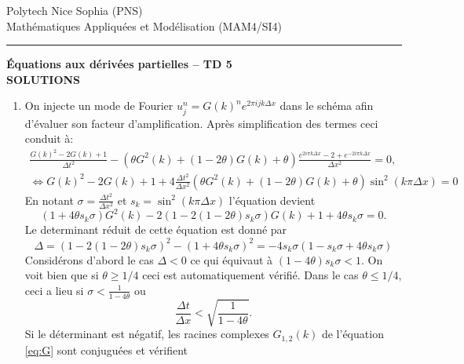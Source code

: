 \documentclass[12pt,a4paper]{article}
\begin{document}
 \hfill Polytech Nice Sophia (PNS)\\
\noindent Math\'ematiques Appliqu\'ees et Mod\'elisation (MAM4/SI4) \hfill \\

\hrule

\bigskip
\bigskip

\begin{center}{\bf \'Equations aux d\'eriv\'ees partielles -- TD 5 \\
SOLUTIONS}\end{center}

\bigskip

\begin{enumerate}
\item On injecte un mode de Fourier $u_j^n= G(k)^n e^{2\pi ijk\Delta
    x}$ dans le sch\'ema afin d'\'evaluer son facteur
  d'amplification. Apr\`es simplification des termes ceci conduit \`a:
\begin{equation}
\begin{array}{l}
\displaystyle\frac{G(k)^2-2G(k)+1}{\Delta t ^2}-(\theta
G^2(k)+(1-2\theta)G(k)+\theta)\frac{e^{2i\pi k\Delta x} -2 + e^{-2i\pi
    k\Delta x}}{\Delta x^2}=0,\\
\displaystyle\Leftrightarrow G(k)^2-2G(k)+1 + 4\frac{\Delta t^2}{\Delta x^2} (\theta
G^2(k)+(1-2\theta)G(k)+\theta) \sin^2(k\pi \Delta x)=0
\end{array}
\end{equation}
En notant $\sigma=\frac{\Delta t^2}{\Delta x^2}$ et $s_k = \sin^2(k\pi
\Delta x)$ l'\'equation devient
\begin{equation}\label{eq:G}
(1+4\theta s_k \sigma)G^2(k)-2(1- 2(1-2\theta) s_k\sigma)G(k)+1+4\theta s_k\sigma=0.
\end{equation}
Le determinant r\'eduit de cette \'equation est donn\'e par
$$
\Delta =(1- 2(1-2\theta) s_k\sigma)^2-(1+4\theta s_k
\sigma)^2=-4s_k\sigma (1-s_k\sigma +4\theta s_k\sigma)
$$
Consid\'erons d'abord le cas $\Delta < 0$ ce qui \'equivaut \`a $(1-4\theta) s_k\sigma <
1$. On voit bien que si $\theta \ge 1/4$ ceci est automatiquement
v\'erifi\'e. Dans le cas $\theta \le 1/4$, ceci a lieu si $\sigma <
\frac{1}{1-4\theta}$ ou
\begin{equation}\label{eq:cond}
\frac{\Delta t}{\Delta x}< \sqrt{\frac{1}{1-4\theta}}.
\end{equation}
Si le d\'eterminant est n\'egatif, les racines complexes $G_{1,2}(k)$ de
l'\'equation \eqref{eq:G} sont conjugu\'ees et v\'erifient

\end{enumerate}
\end{document}
